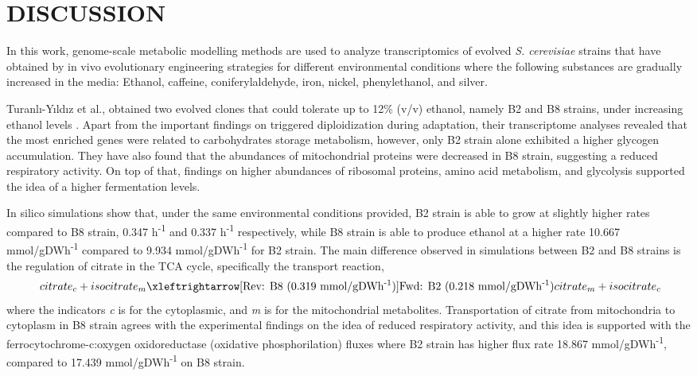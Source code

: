 \chapter{DISCUSSION}

In this work, genome-scale metabolic modelling methods are used to analyze transcriptomics of evolved \emph{S. cerevisiae} strains that have obtained by in vivo evolutionary engineering strategies for different environmental conditions where the following substances are gradually increased in the media: Ethanol, caffeine, coniferylaldehyde, iron, nickel, phenylethanol, and silver.

Turanlı-Yıldız et al., obtained two evolved clones that could tolerate up to 12\% (v/v) ethanol, namely B2 and B8 strains, under increasing ethanol levels \cite{TuranlYldz2017}. Apart from the important findings on triggered diploidization during adaptation, their transcriptome analyses revealed that the most enriched genes were related to carbohydrates storage metabolism, however, only B2 strain alone exhibited a higher glycogen accumulation. They have also found that the abundances of mitochondrial proteins were decreased in B8 strain, suggesting a reduced respiratory activity. On top of that, findings on higher abundances of ribosomal proteins, amino acid metabolism, and glycolysis supported the idea of a higher fermentation levels.

In silico simulations show that, under the same environmental conditions provided, B2 strain is able to grow at slightly higher rates compared to B8 strain, 0.347 h\textsuperscript{-1} and 0.337 h\textsuperscript{-1} respectively, while B8 strain is able to produce ethanol at a higher rate 10.667 mmol/gDWh\textsuperscript{-1} compared to 9.934 mmol/gDWh\textsuperscript{-1} for B2 strain. The main difference observed in simulations between B2 and B8 strains is the regulation of citrate in the TCA cycle, specifically the transport reaction,
\begin{align}
\label{eq:citratetransport}
\ citrate_c + isocitrate_m \xleftrightarrow[\text{Rev: B8 (0.319 mmol/gDWh\textsuperscript{-1})}]{\text{Fwd: B2 (0.218 mmol/gDWh\textsuperscript{-1})}} citrate_m + isocitrate_c
\end{align}
\noindent where the indicators \emph{c} is for the cytoplasmic, and \emph{m} is for the mitochondrial metabolites. Transportation of citrate from mitochondria to cytoplasm in B8 strain agrees with the experimental findings on the idea of reduced respiratory activity, and this idea is supported with the ferrocytochrome-c:oxygen oxidoreductase (oxidative phosphorilation) fluxes where B2 strain has higher flux rate 18.867 mmol/gDWh\textsuperscript{-1}, compared to 17.439 mmol/gDWh\textsuperscript{-1} on B8 strain.

